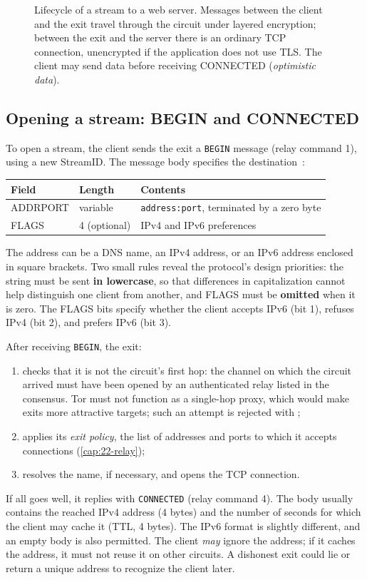 \begin{figure}[htbp]
\centering

\caption{Lifecycle of a stream to a web server. Messages between the client and the exit travel through the circuit under layered encryption; between the exit and the server there is an ordinary TCP connection, unencrypted if the application does not use TLS. The client may send data before receiving CONNECTED (\emph{optimistic data}).}
\label{fig:stream}
\end{figure}

\subsection{Opening a stream: BEGIN and CONNECTED}

To open a stream, the client sends the exit a \texttt{BEGIN} message (relay command 1), using a new StreamID. The message body specifies the destination~:
\begin{center}
\begin{tabular}{lll}
\toprule
Field & Length & Contents \\
\midrule
ADDRPORT & variable & \texttt{address:port}, terminated by a zero byte \\
FLAGS & 4 (optional) & IPv4 and IPv6 preferences \\
\bottomrule
\end{tabular}
\end{center}
The address can be a DNS name, an IPv4 address, or an IPv6 address enclosed in square brackets. Two small rules reveal the protocol's design priorities: the string must be sent \textbf{in lowercase}, so that differences in capitalization cannot help distinguish one client from another, and FLAGS must be \textbf{omitted} when it is zero. The FLAGS bits specify whether the client accepts IPv6 (bit 1), refuses IPv4 (bit 2), and prefers IPv6 (bit 3).

After receiving \texttt{BEGIN}, the exit:
\begin{enumerate}
  \item checks that it is not the circuit's first hop: the channel on which the circuit arrived must have been opened by an authenticated relay listed in the consensus. Tor must not function as a single-hop proxy, which would make exits more attractive targets; such an attempt is rejected with ;
  \item applies its \emph{exit policy}, the list of addresses and ports to which it accepts connections (\cref{cap:22-relay});
  \item resolves the name, if necessary, and opens the TCP connection.
\end{enumerate}
If all goes well, it replies with \texttt{CONNECTED} (relay command 4). The body usually contains the reached IPv4 address (4 bytes) and the number of seconds for which the client may cache it (TTL, 4 bytes). The IPv6 format is slightly different, and an empty body is also permitted. The client \emph{may} ignore the address; if it caches the address, it must not reuse it on other circuits. A dishonest exit could lie or return a unique address to recognize the client later.


